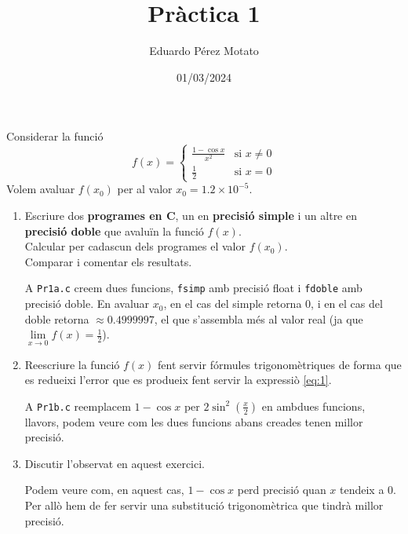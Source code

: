 \documentclass[a4paper, 12pt]{article}
\title{Pràctica 1}
\author{Eduardo Pérez Motato}
\date{01/03/2024}
\begin{document}
    \makeheader

    \begin{exercici}
        Considerar la funció
        \begin{equation}
            f\left(x\right) = 
            \begin{cases}
                \frac{1-\cos{x}}{x^2} & \text{si } x \neq 0\\
                \frac{1}{2} & \text{si } x = 0
            \end{cases}
            \label{eq:1}
        \end{equation}
        Volem avaluar $f(x_0)$ per al valor $x_0 = 1.2 \times 10^{-5}$.
        \begin{enumerate}[label=\alph*)]
            \item Escriure dos \textbf{programes en C}, un en \textbf{precisió simple} i un altre en
            \textbf{precisió doble} que avaluïn la funció $f\left(x\right)$.\\
            Calcular per cadascun dels programes el valor $f\left(x_0\right)$.\\
            Comparar i comentar els resultats.\\
            \begin{solucio}
                A \verb|Pr1a.c| creem dues funcions, \verb|fsimp| amb precisió float i \verb|fdoble|
                amb precisió doble. En avaluar $x_0$, en el cas del simple retorna $0$, i en el cas
                del doble retorna $\approx 0.4999997$, el que s'assembla més al valor real (ja que
                $\lim\limits_{x \to 0} f\left(x\right) = \frac{1}{2}$).
            \end{solucio}
            \item Reescriure la funció $f\left(x\right)$ fent servir fórmules trigonomètriques de
            forma que es redueixi l'error que es produeix fent servir la expressiò \eqref{eq:1}.\\
            \begin{solucio}
                A \verb|Pr1b.c| reemplacem $1-\cos{x}$ per $2\sin^2{\left(\frac{x}{2}\right)}$ en
                ambdues funcions, llavors, podem veure com les dues funcions abans creades tenen
                millor precisió.
            \end{solucio}
            \item Discutir l'observat en aquest exercici.\\
            \begin{solucio}
                Podem veure com, en aquest cas, $1-\cos{x}$ perd precisió quan $x$ tendeix a $0$.
                Per allò hem de fer servir una substitució trigonomètrica que tindrà millor precisió.
            \end{solucio}
        \end{enumerate}
    \end{exercici}
\end{document}
